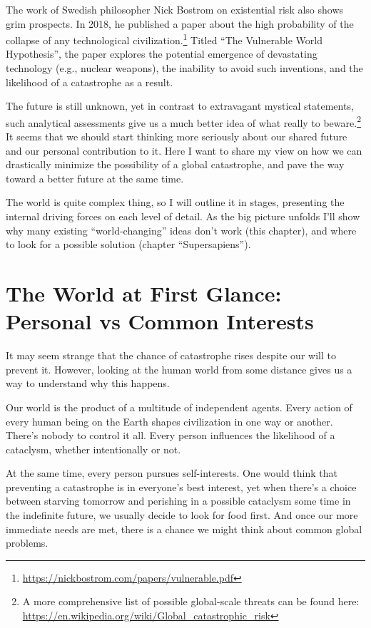 \documentclass[12pt]{report}
\begin{document}
\noindent The work of Swedish philosopher Nick Bostrom on existential risk also shows grim prospects. In 2018, he published a paper about the high probability of the collapse of any technological civilization.\footnote{\url{https://nickbostrom.com/papers/vulnerable.pdf}} Titled ``The Vulnerable World Hypothesis'', the paper explores the potential emergence of devastating technology (e.g., nuclear weapons), the inability to avoid such inventions, and the likelihood of a catastrophe as a result.

\noindent The future is still unknown, yet in contrast to extravagant mystical statements, such analytical assessments give us a much better idea of what really to beware.\footnote{A more comprehensive list of possible global-scale threats can be found here: \url{https://en.wikipedia.org/wiki/Global_catastrophic_risk}} It seems that we should start thinking more seriously about our shared future and our personal contribution to it. Here I want to share my view on how we can drastically minimize the possibility of a global catastrophe, and pave the way toward a better future at the same time.

\noindent The world is quite complex thing, so I will outline it in stages, presenting the internal driving forces on each level of detail. As the big picture unfolds I’ll show why many existing ``world-changing'' ideas don’t work (this chapter), and where to look for a possible solution (chapter ``Supersapiens'').

\section*{The World at First Glance: Personal vs Common Interests}

It may seem strange that the chance of catastrophe rises despite our will to prevent it. However, looking at the human world from some distance gives us a way to understand why this happens.

\noindent Our world is the product of a multitude of independent agents. Every action of every human being on the Earth shapes civilization in one way or another. There’s nobody to control it all. Every person influences the likelihood of a cataclysm, whether intentionally or not.

\noindent At the same time, every person pursues self-interests. One would think that preventing a catastrophe is in everyone’s best interest, yet when there’s a choice between starving tomorrow and perishing in a possible cataclysm some time in the indefinite future, we usually decide to look for food first. And once our more immediate needs are met, there is a chance we might think about common global problems.
\end{document}
